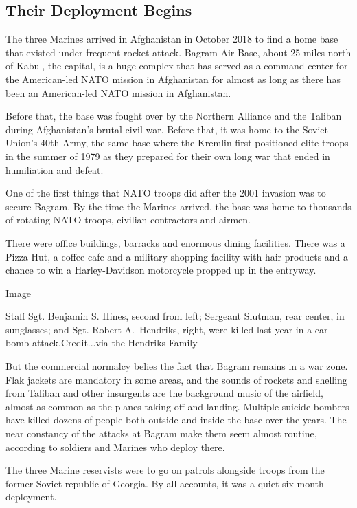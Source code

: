 \hypertarget{their-deployment-begins}{%
\subsection{Their Deployment Begins}\label{their-deployment-begins}}

The three Marines arrived in Afghanistan in October 2018 to find a home
base that existed under frequent rocket attack. Bagram Air Base, about
25 miles north of Kabul, the capital, is a huge complex that has served
as a command center for the American-led NATO mission in Afghanistan for
almost as long as there has been an American-led NATO mission in
Afghanistan.

Before that, the base was fought over by the Northern Alliance and the
Taliban during Afghanistan's brutal civil war. Before that, it was home
to the Soviet Union's 40th Army, the same base where the Kremlin first
positioned elite troops in the summer of 1979 as they prepared for their
own long war that ended in humiliation and defeat.

One of the first things that NATO troops did after the 2001 invasion was
to secure Bagram. By the time the Marines arrived, the base was home to
thousands of rotating NATO troops, civilian contractors and airmen.

There were office buildings, barracks and enormous dining facilities.
There was a Pizza Hut, a coffee cafe and a military shopping facility
with hair products and a chance to win a Harley-Davidson motorcycle
propped up in the entryway.

Image

Staff Sgt. Benjamin S. Hines, second from left; Sergeant Slutman, rear
center, in sunglasses; and Sgt. Robert A.~Hendriks, right, were killed
last year in a car bomb attack.Credit...via the Hendriks Family

But the commercial normalcy belies the fact that Bagram remains in a war
zone. Flak jackets are mandatory in some areas, and the sounds of
rockets and shelling from Taliban and other insurgents are the
background music of the airfield, almost as common as the planes taking
off and landing. Multiple suicide bombers have killed dozens of people
both outside and inside the base over the years. The near constancy of
the attacks at Bagram make them seem almost routine, according to
soldiers and Marines who deploy there.

The three Marine reservists were to go on patrols alongside troops from
the former Soviet republic of Georgia. By all accounts, it was a quiet
six-month deployment.

